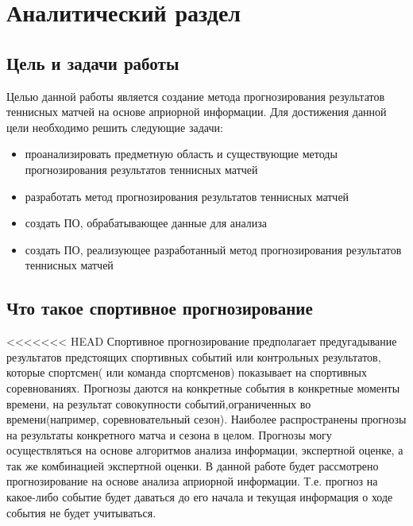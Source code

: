 \chapter{Аналитический раздел}
\label{cha:analysis}
\section{Цель и задачи работы}
Целью данной работы является создание метода прогнозирования результатов теннисных матчей на основе априорной информации.
Для достижения данной цели необходимо решить следующие задачи:
\begin{itemize}
	
\item проанализировать предметную область и существующие методы прогнозирования результатов теннисных матчей
	\item разработать метод прогнозирования результатов теннисных матчей
	\item создать ПО, обрабатывающее данные для анализа
	\item создать ПО, реализующее  разработанный метод прогнозирования результатов теннисных матчей
\end{itemize}
\section{Что такое спортивное прогнозирование}
<<<<<<< HEAD
Спортивное прогнозирование предполагает предугадывание результатов предстоящих спортивных событий или контрольных результатов, которые спортсмен( или команда спортсменов) показывает на спортивных соревнованиях\cite{Book01}. Прогнозы даются на конкретные события в конкретные моменты времени, на результат совокупности событий,ограниченных во времени(например, соревновательный сезон). Наиболее распространены прогнозы на результаты конкретного матча и сезона в целом. Прогнозы могу осуществляться на основе алгоритмов анализа информации, экспертной оценке, а так же комбинацией экспертной оценки. В данной работе будет рассмотрено прогнозирование на основе анализа априорной информации. Т.е. прогноз на какое-либо событие будет даваться до его начала и текущая информация о ходе события не будет учитываться.

